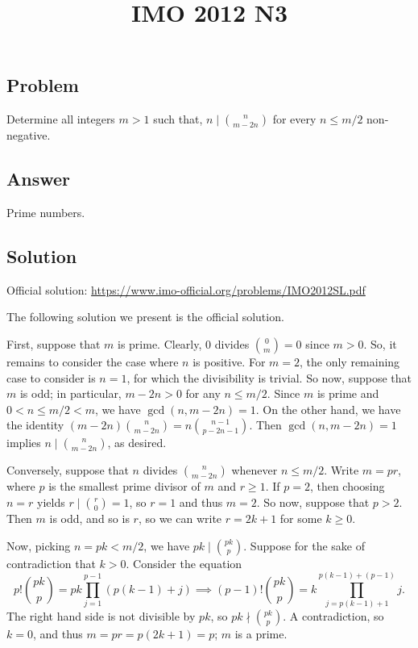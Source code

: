 \documentclass{article}
\title{IMO 2012 N3}
\author{}
\date{}
\begin{document}
\maketitle



\subsection*{Problem}

Determine all integers $m > 1$ such that, $n \mid \binom{n}{m - 2n}$ for every $n \leq m/2$ non-negative.



\subsection*{Answer}

Prime numbers.



\subsection*{Solution}

Official solution: \url{https://www.imo-official.org/problems/IMO2012SL.pdf}

The following solution we present is the official solution.

First, suppose that $m$ is prime.
Clearly, $0$ divides $\binom{0}{m} = 0$ since $m > 0$.
So, it remains to consider the case where $n$ is positive.
For $m = 2$, the only remaining case to consider is $n = 1$, for which the divisibility is trivial.
So now, suppose that $m$ is odd; in particular, $m - 2n > 0$ for any $n \leq m/2$.
Since $m$ is prime and $0 < n \leq m/2 < m$, we have $\gcd(n, m - 2n) = 1$.
On the other hand, we have the identity $(m - 2n) \binom{n}{m - 2n} = n \binom{n - 1}{p - 2n - 1}$.
Then $\gcd(n, m - 2n) = 1$ implies $n \mid \binom{n}{m - 2n}$, as desired.

Conversely, suppose that $n$ divides $\binom{n}{m - 2n}$ whenever $n \leq m/2$.
Write $m = pr$, where $p$ is the smallest prime divisor of $m$ and $r \geq 1$.
If $p = 2$, then choosing $n = r$ yields $r \mid \binom{r}{0} = 1$, so $r = 1$ and thus $m = 2$.
So now, suppose that $p > 2$.
Then $m$ is odd, and so is $r$, so we can write $r = 2k + 1$ for some $k \geq 0$.

Now, picking $n = pk < m/2$, we have $pk \mid \binom{pk}{p}$.
Suppose for the sake of contradiction that $k > 0$.
Consider the equation
\[ p! \binom{pk}{p} = pk \prod_{j = 1}^{p - 1} (p(k - 1) + j) \implies (p - 1)! \binom{pk}{p} = k \prod_{j = p(k - 1) + 1}^{p(k - 1) + (p - 1)} j. \]
The right hand side is not divisible by $pk$, so $pk \nmid \binom{pk}{p}$.
A contradiction, so $k = 0$, and thus $m = pr = p(2k + 1) = p$; $m$ is a prime.
\end{document}
